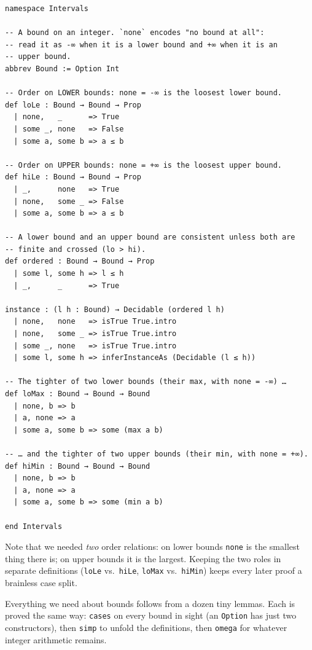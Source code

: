 \documentclass[12pt, a4paper, openright]{book}
\theoremstyle{thmstyle}
\theoremstyle{defstyle}
\newcommand{\lc}[1]{\texttt{#1}}
\begin{document}
\begin{verbatim}
namespace Intervals

-- A bound on an integer. `none` encodes "no bound at all":
-- read it as -∞ when it is a lower bound and +∞ when it is an
-- upper bound.
abbrev Bound := Option Int

-- Order on LOWER bounds: none = -∞ is the loosest lower bound.
def loLe : Bound → Bound → Prop
  | none,   _      => True
  | some _, none   => False
  | some a, some b => a ≤ b

-- Order on UPPER bounds: none = +∞ is the loosest upper bound.
def hiLe : Bound → Bound → Prop
  | _,      none   => True
  | none,   some _ => False
  | some a, some b => a ≤ b

-- A lower bound and an upper bound are consistent unless both are
-- finite and crossed (lo > hi).
def ordered : Bound → Bound → Prop
  | some l, some h => l ≤ h
  | _,      _      => True

instance : (l h : Bound) → Decidable (ordered l h)
  | none,   none   => isTrue True.intro
  | none,   some _ => isTrue True.intro
  | some _, none   => isTrue True.intro
  | some l, some h => inferInstanceAs (Decidable (l ≤ h))

-- The tighter of two lower bounds (their max, with none = -∞) …
def loMax : Bound → Bound → Bound
  | none, b => b
  | a, none => a
  | some a, some b => some (max a b)

-- … and the tighter of two upper bounds (their min, with none = +∞).
def hiMin : Bound → Bound → Bound
  | none, b => b
  | a, none => a
  | some a, some b => some (min a b)

end Intervals
\end{verbatim}

Note that we needed \emph{two} order relations: on lower bounds \lc{none}
is the smallest thing there is; on upper bounds it is the largest. Keeping
the two roles in separate definitions (\lc{loLe} vs.\ \lc{hiLe}, \lc{loMax}
vs.\ \lc{hiMin}) keeps every later proof a brainless case split.

Everything we need about bounds follows from a dozen tiny lemmas. Each is
proved the same way: \lc{cases} on every bound in sight (an \lc{Option} has
just two constructors), then \lc{simp} to unfold the definitions, then
\lc{omega} for whatever integer arithmetic remains.
\end{document}
